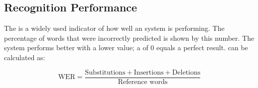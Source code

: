 \subsection{Recognition Performance}

The  is a widely used indicator of how well an  system is performing. 
The percentage of words that were incorrectly predicted is shown by this number. 
The  system performs better with a lower value; a  of 0 equals a perfect result.  can be calculated as:

\begin{equation}
    \text{WER} = \frac{\text{Substitutions} + \text{Insertions} + \text{Deletions}}{\text{Reference words}}
\end{equation}